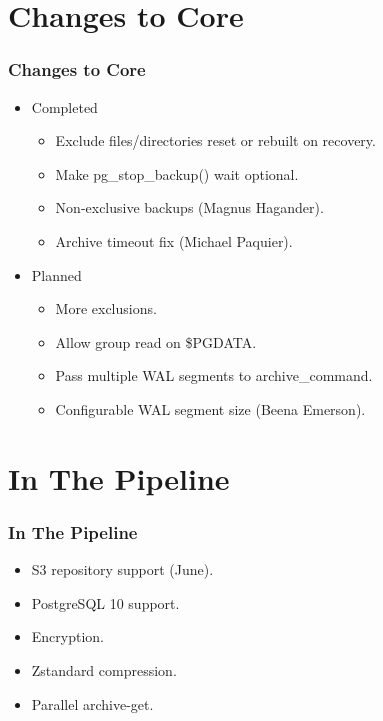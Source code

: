 \section{Changes to Core}

\begin{frame}
    \frametitle{Changes to Core}

    \begin{itemize}
        \item Completed

            \begin{itemize}
                \item Exclude files/directories reset or rebuilt on recovery.\pause
                \item Make pg\_stop\_backup() wait optional.\pause
                \item Non-exclusive backups (Magnus Hagander).\pause
                \item Archive timeout fix (Michael Paquier).\pause
            \end{itemize}

        \item Planned

            \begin{itemize}
                \item More exclusions.\pause
                \item Allow group read on \$PGDATA.\pause
                \item Pass multiple WAL segments to archive\_command.\pause
                \item Configurable WAL segment size (Beena Emerson).
            \end{itemize}
    \end{itemize}
\end{frame}

\section{In The Pipeline}

\begin{frame}
    \frametitle{In The Pipeline}

    \begin{itemize}
        \item S3 repository support (June).\pause
        \item PostgreSQL 10 support.\pause
        \item Encryption.\pause
        \item Zstandard compression.\pause
        \item Parallel archive-get.
    \end{itemize}
\end{frame}

